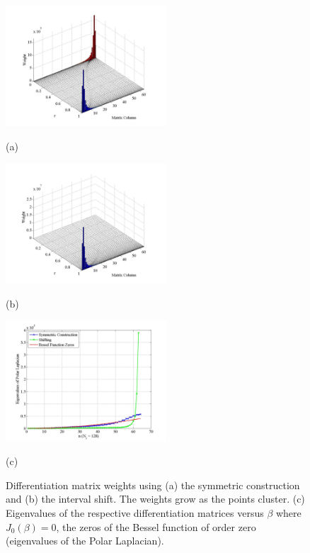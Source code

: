 \documentclass[12pt]{article}
\begin{document}
\begin{figure}
\hfill
\begin{minipage}[H]{6.5cm}
\begin{center}
\includegraphics[width=6cm,clip]{20090806_Weights_ShiftedDM}
\end{center}
\begin{center}
(a)
\end{center}
\end{minipage}
\hfill
\begin{minipage}[H]{6.5cm}
\begin{center}
\includegraphics[width=6cm,clip]{20090806_Weights_TrefFornDM}
\end{center}
\begin{center}
(b)
\end{center}
\end{minipage}
\hfill
\begin{minipage}[H]{6.5cm}
\begin{center}
\includegraphics[width=6cm,clip]{20090806_evs_BesselZerosVsNumEvs3way}
\end{center}
\begin{center}
(c)
\end{center}
\end{minipage}
\caption{Differentiation matrix weights using (a) the symmetric construction and (b) the interval shift. The weights grow as the points cluster. (c) Eigenvalues of the respective differentiation matrices versus $\beta$ where $J_0(\beta)=0$, the zeros of the Bessel function of order zero (eigenvalues of the Polar Laplacian).}\label{fig:weights_evs}
\end{figure}
\end{document}
